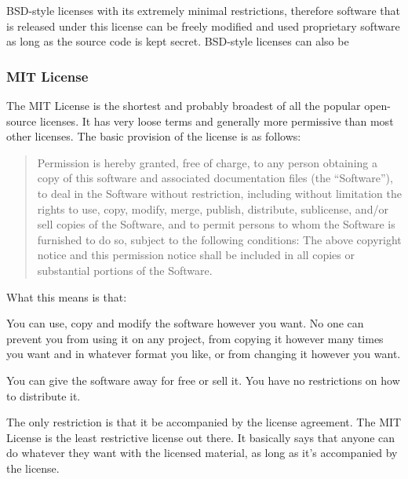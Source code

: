 \documentclass[12pt, onecolumn]{witseiepaper}
\begin{document}
BSD-style licenses with its extremely minimal restrictions, therefore software that is released under this license can be freely modified and used proprietary software as long as the source code is kept secret.  BSD-style licenses can also be 


\subsubsection{MIT License}

The MIT License is the shortest and probably broadest of all the popular open-source licenses.\cite{MIT} It has very loose terms and generally more permissive than most other licenses. The basic provision of the license is as follows:

\begin{quotation}
	Permission is hereby granted, free of charge, to any person obtaining a copy of this software and associated documentation files (the “Software”), to deal in the Software without restriction, including without limitation the rights to use, copy, modify, merge, publish, distribute, sublicense, and/or sell copies of the Software, and to permit persons to whom the Software is furnished to do so, subject to the following conditions:
	The above copyright notice and this permission notice shall be included in all copies or substantial portions of the Software.
\end{quotation}

What this means is that:


\textbullet \space You can use, copy and modify the software however you want. No one can prevent you from using it on any project, from copying it however many times you want and in whatever format you like, or from changing it however you want.

\textbullet \space You can give the software away for free or sell it. You have no restrictions on how to distribute it.

\textbullet \space The only restriction is that it be accompanied by the license agreement.
The MIT License is the least restrictive license out there. It basically says that anyone can do whatever they want with the licensed material, as long as it’s accompanied by the license.
\end{document}
